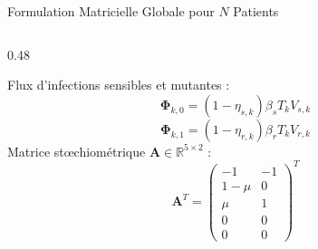 \documentclass[aspectratio=169, 10pt, french]{beamer}
\begin{document}
\begin{frame}{Formulation Matricielle Globale pour $N$ Patients}
\begin{columns}[t]
        \begin{column}{0.48\textwidth}
            \begin{cadrehpc}
                \footnotesize
                Flux d'infections sensibles et mutantes :
                $$\mathbf{\Phi}_{k,0} = (1 - \eta_{s,k})\beta_s T_k V_{s,k}$$
                $$\mathbf{\Phi}_{k,1} = (1 - \eta_{r,k})\beta_r T_k V_{r,k}$$
                Matrice stœchiométrique $\mathbf{A} \in \mathbb{R}^{5 \times 2}$ :
                $$\mathbf{A}^T = \begin{pmatrix} -1 & -1 \\ 1-\mu & 0 \\ \mu & 1 \\ 0 & 0 \\ 0 & 0 \end{pmatrix}^T$$
            \end{cadrehpc}
        \end{column}
    \end{columns}
\end{frame}
\end{document}
